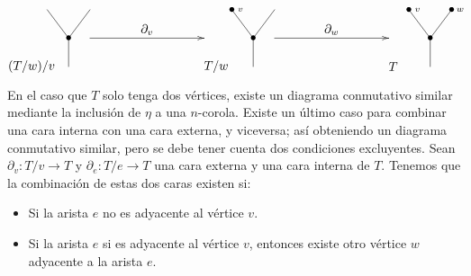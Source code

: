 \documentclass[11pt,a4paper,openright,oneside]{article}
\numberwithin{equation}{section}
\theoremstyle{definition}
\begin{document}
\begin{equation}
    \xy
    <0.08cm, 0cm>:
    (0.0, 0.0)*{}="1"; %
    (0.0, 10.0)*=0{\bullet}="2"; %
    (-7.5, 20.0)*{}="3"; %
    (7.5, 20.0)*{}="4"; %
    "1";"2" **\dir{-};
    "2";"3" **\dir{-};
    "2";"4" **\dir{-};
    (-13,0)*{(T/w)/v};
    \endxy
    \xy
    <0.08cm, 0cm>:
    (-20, 0.0)*{}="1";
    (20, 0.0)*{}="2";
    (20, 10)*{}="3";
    (-20, 0)*{}="4";
    {\ar(-20, 10)*{};(20,10)*{}};
    (0,13)*{\partial_v};
    \endxy
    \xy
    <0.08cm, 0cm>:
    (0.0, 0.0)*{}="1"; %
    (0.0, 10.0)*=0{\bullet}="2"; %
    (-7.5, 20.0)*=0{\bullet}="3"; %
    (7.5, 20.0)*{}="4"; %
    "1";"2" **\dir{-};
    "2";"3" **\dir{-};
    "2";"4" **\dir{-};
    (-4.5, 20.0)*=0{\scriptstyle v};
    (-13,0)*{T/w};
    \endxy
    \xy
    <0.08cm, 0cm>:
    (-20, 0.0)*{}="1";
    (20, 0.0)*{}="2";
    (20, 10)*{}="3";
    (-20, 0)*{}="4";
    {\ar(-20, 10)*{};(20,10)*{}};
    (0,13)*{\partial_w};
    \endxy
    \xy
    <0.08cm, 0cm>:
    (0.0, 0.0)*{}="1"; %
    (0.0, 10.0)*=0{\bullet}="2"; %
    (-7.5, 20.0)*=0{\bullet}="3"; %
    (7.5, 20.0)*=0{\bullet}="4"; %
    "1";"2" **\dir{-};
    "2";"3" **\dir{-};
    "2";"4" **\dir{-};
    (-4.5, 20.0)*=0{\scriptstyle v};
    (10.5, 20.0)*=0{\scriptstyle w};
    (-13,0)*{T};
    \endxy
\end{equation}

En el caso que $T$ solo tenga dos v\'ertices, existe un diagrama conmutativo similar mediante la inclusi\'on de $\eta$ a una $n$-corola.
Existe un \'ultimo caso para combinar una cara interna con una cara externa, y viceversa; as\'i obteniendo un diagrama conmutativo similar, pero se debe tener cuenta dos condiciones excluyentes.
Sean $\partial_v \colon T/v\to T$ y $\partial_e \colon T/e\to T$ una cara externa y una cara interna de $T$. Tenemos que la combinaci\'on de estas dos caras existen si:
\begin{itemize}
    \item Si la arista $e$ no es adyacente al v\'ertice $v$.
    \item Si la arista $e$ si es adyacente al v\'ertice $v$, entonces existe otro v\'ertice $w$ adyacente a la arista $e$.
\end{itemize}
\end{document}
